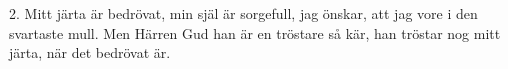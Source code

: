 2.  Mitt järta är bedrövat, min själ är sorgefull,
    jag önskar, att jag vore i den svartaste mull.
    Men Härren Gud han är en tröstare så kär,
    han tröstar nog mitt järta, när det bedrövat är.
